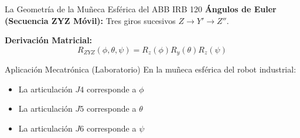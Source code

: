\documentclass[aspectratio=169]{beamer}
\begin{document}
\begin{frame}{La Geometría de la Muñeca Esférica del ABB IRB 120}
    \textbf{Ángulos de Euler (Secuencia ZYZ Móvil):} Tres giros sucesivos $Z \to Y' \to Z''$.
    
    \vspace{0.2cm}
    \textbf{Derivación Matricial:}
    \begin{equation*}
        R_{ZYZ}(\phi, \theta, \psi) = R_z(\phi) R_y(\theta) R_z(\psi)
    \end{equation*}
    
    \vspace{0.1cm}
    \begin{center}
    \end{center}
    
    \vspace{0.3cm}
    \begin{block}{Aplicación Mecatrónica (Laboratorio)}
        En la muñeca esférica del robot industrial:
        \begin{itemize}
            \item La articulación $J4$ corresponde a $\phi$
            \item La articulación $J5$ corresponde a $\theta$
            \item La articulación $J6$ corresponde a $\psi$
        \end{itemize}
    \end{block}
\end{frame}
\end{document}
